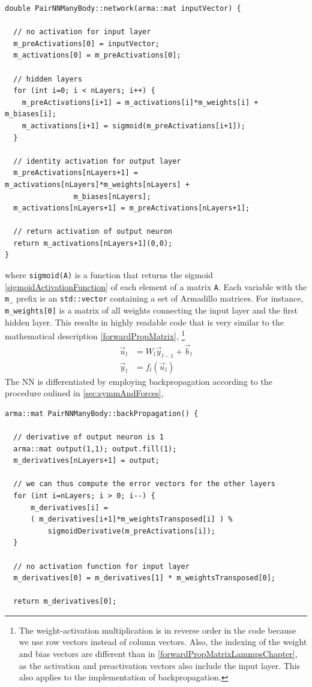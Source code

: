 \documentclass[twoside,english]{uiofysmaster}
\begin{document}
\begin{verbatim}
double PairNNManyBody::network(arma::mat inputVector) {

  // no activation for input layer
  m_preActivations[0] = inputVector;
  m_activations[0] = m_preActivations[0];

  // hidden layers
  for (int i=0; i < nLayers; i++) {
    m_preActivations[i+1] = m_activations[i]*m_weights[i] + m_biases[i];
    m_activations[i+1] = sigmoid(m_preActivations[i+1]);
  }

  // identity activation for output layer
  m_preActivations[nLayers+1] = m_activations[nLayers]*m_weights[nLayers] + 
				m_biases[nLayers];
  m_activations[nLayers+1] = m_preActivations[nLayers+1];

  // return activation of output neuron
  return m_activations[nLayers+1](0,0);
}
\end{verbatim}
where \texttt{sigmoid(A)} is a function that returns the sigmoid \eqref{sigmoidActivationFunction} 
of each element of a matrix \texttt{A}. 
Each variable with the \texttt{m\_} prefix is an \texttt{std::vector} containing a set of Armadillo matrices. 
For instance, \texttt{m\_weights[0]} is a matrix of all weights connecting the input layer 
and the first hidden layer. This results in highly readable code that is very similar to the mathematical 
description \eqref{forwardPropMatrix}, 
\footnote{The weight-activation multiplication is in reverse order in the code because we use row vectors instead of column vectors.
Also, the indexing of the weight and bias vectors are different than in \eqref{forwardPropMatrixLammpsChapter}, as 
the activation and preactivation vectors also include the input layer. This also applies to the implementation
of backpropagation.}
\begin{equation}
 \begin{aligned}
  \vec{u}_l &= W_l\vec{y}_{l-1} + \vec{b}_l \\
  \vec{y}_l &= f_l(\vec{u}_l)
  \label{forwardPropMatrixLammpsChapter}
\end{aligned}
\end{equation}
The NN is differentiated by employing backpropagation according to the procedure oulined in \autoref{sec:symmAndForces},
\begin{verbatim}
arma::mat PairNNManyBody::backPropagation() {

  // derivative of output neuron is 1
  arma::mat output(1,1); output.fill(1);
  m_derivatives[nLayers+1] = output;

  // we can thus compute the error vectors for the other layers
  for (int i=nLayers; i > 0; i--) {
      m_derivatives[i] = 
	  ( m_derivatives[i+1]*m_weightsTransposed[i] ) %
          sigmoidDerivative(m_preActivations[i]);
  }

  // no activation function for input layer
  m_derivatives[0] = m_derivatives[1] * m_weightsTransposed[0];

  return m_derivatives[0];
\end{verbatim}
\end{document}
